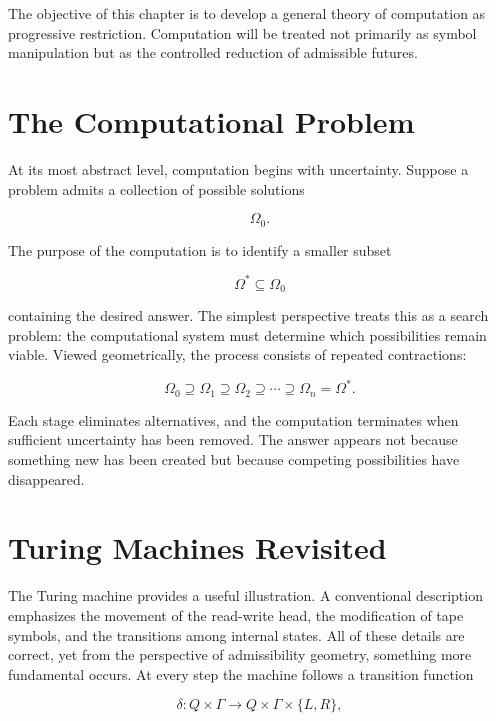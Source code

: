 \documentclass[11pt,oneside]{book}
\theoremstyle{plain}
\theoremstyle{definition}
\theoremstyle{remark}
\begin{document}
The objective of this chapter is to develop a general theory of computation as progressive restriction. Computation will be treated not primarily as symbol manipulation but as the controlled reduction of admissible futures.

\section{The Computational Problem}

At its most abstract level, computation begins with uncertainty. Suppose a problem admits a collection of possible solutions

\begin{equation}
\Omega_0.
\end{equation}

The purpose of the computation is to identify a smaller subset

\begin{equation}
\Omega^\ast
\subseteq
\Omega_0
\end{equation}

containing the desired answer. The simplest perspective treats this as a search problem: the computational system must determine which possibilities remain viable. Viewed geometrically, the process consists of repeated contractions:

\begin{equation}
\Omega_0
\supseteq
\Omega_1
\supseteq
\Omega_2
\supseteq
\cdots
\supseteq
\Omega_n
=
\Omega^\ast.
\end{equation}

Each stage eliminates alternatives, and the computation terminates when sufficient uncertainty has been removed. The answer appears not because something new has been created but because competing possibilities have disappeared.

\section{Turing Machines Revisited}

The Turing machine provides a useful illustration. A conventional description emphasizes the movement of the read-write head, the modification of tape symbols, and the transitions among internal states. All of these details are correct, yet from the perspective of admissibility geometry, something more fundamental occurs. At every step the machine follows a transition function

\begin{equation}
\delta
:
Q
\times
\Gamma
\rightarrow
Q
\times
\Gamma
\times \{L,R\},
\end{equation}
\end{document}
